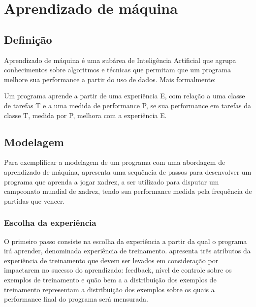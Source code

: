 \chapter{Aprendizado de máquina}

\section{Definição}

Aprendizado de máquina é uma subárea de Inteligência Artificial que agrupa conhecimentos sobre algoritmos e técnicas que permitam que um programa melhore sua performance a partir do uso de dados. Mais formalmente:

\begin{citacao}
Um programa aprende a partir de uma experiência E, com relação a uma classe de tarefas T e a uma medida de performance P, se sua performance em tarefas da classe T, medida por P, melhora com a experiência E. \cite[p.2, tradução nossa]{Tom_mitchell}
\end{citacao}


\section{Modelagem}

Para exemplificar a modelagem de um programa com uma abordagem de aprendizado de máquina, \cite{Tom_mitchell} apresenta uma sequência de passos para desenvolver um programa que aprenda a jogar xadrez, a ser utilizado para disputar um campeonato mundial de xadrez, tendo sua performance medida pela frequência de partidas que vencer.

\subsection*{Escolha da experiência}

O primeiro passo consiste na escolha da experiência a partir da qual o programa irá aprender, denominada experiência de treinamento. 
\cite{Tom_mitchell} apresenta três atributos da experiência de treinamento que devem ser levados em consideração por impactarem no sucesso do aprendizado: feedback, nível de controle sobre os exemplos de treinamento e quão bem a a distribuição dos exemplos de treinamento representam a distribuição dos exemplos sobre os quais a performance final do programa será mensurada.

